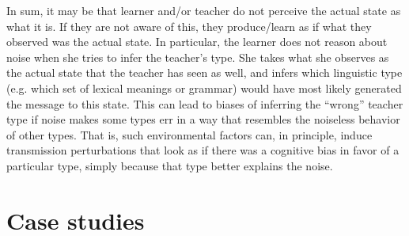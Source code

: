 \documentclass[10pt,a4paper]{article}
\begin{document}

In sum, it may be that learner and/or teacher do not perceive the actual state as what
it is. If they are not aware of this, they produce/learn as if what they observed was the
actual state. In particular, the learner does not reason about noise when she tries to infer
the teacher's type. She takes what she observes as the actual state that the teacher has seen
as well, and infers which linguistic type (e.g. which set of lexical meanings or grammar) would have
most likely generated the message to this state. This
can lead to biases of inferring the ``wrong'' teacher type if noise makes some types err in a
way that resembles the noiseless behavior of other types. That is, such environmental factors
can, in principle, induce transmission perturbations that look as if there was a cognitive bias
in favor of a particular type, simply because that type better explains the noise.


\section{Case studies}
\end{document}

